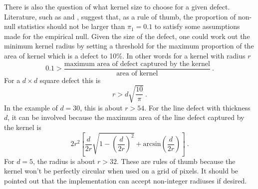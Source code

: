 There is also the question of what kernel size to choose for a given defect. Literature, such as \cite{efron2004large} and \cite{schwartzman2008empirical}, suggest that, as a rule of thumb, the proportion of non-null statistics should not be larger than $\pi_1=0.1$ to satisfy some assumptions made for the empirical null. Given the size of the defect, one could work out the minimum kernel radius by setting a threshold for the maximum proportion of the area of kernel which is a defect to 10\%. In other words for a kernel with radius $r$
\begin{equation}
0.1 > \dfrac{\text{maximum area of defect captured by the kernel}}{\text{area of kernel}} \ .
\end{equation}
For a $d \times d$ square defect this is
\begin{equation}
r > d \sqrt{\dfrac{10}{\pi}} \ .
\end{equation}
In the example of $d=30$, this is about $r>54$. For the line defect with thickness $d$, it can be involved because the maximum area of the line defect captured by the kernel is
\begin{equation}
2r^2
\left[
	\dfrac{d}{2r}\sqrt{1-\left(\dfrac{d}{2r}\right)^2}
	+\text{arcsin}\left(\dfrac{d}{2r}\right)
\right] \ .
\end{equation}
For $d=5$, the radius is about $r>32$. These are rules of thumb because the kernel won't be perfectly circular when used on a grid of pixels. It should be pointed out that the implementation can accept non-integer radiuses if desired.

